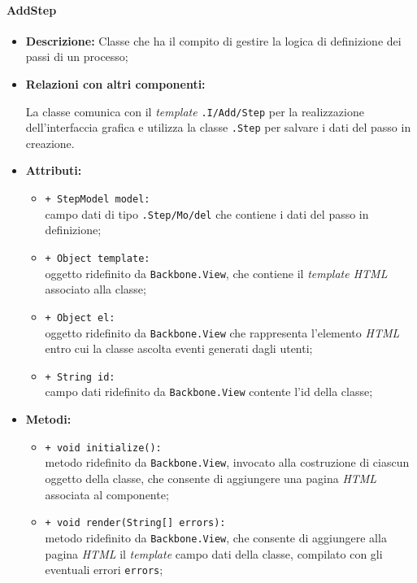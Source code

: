 \paragraph{AddStep}
\label{addStep}
\begin{flushleft}
\begin{itemize}
\item \textbf{Descrizione:} Classe che ha il compito di gestire la logica di definizione dei passi di un processo;
\item \textbf{Relazioni con altri componenti:}
\begin{sloppypar}
La classe comunica con il \textit{template} \texttt{\viewAdmin{}.I\fshyp{}Add\fshyp{}Step} per la realizzazione dell'interfaccia grafica e utilizza la classe \texttt{\model{}.Step} per salvare i dati del passo in creazione.
\end{sloppypar}
\item \textbf{Attributi:}
\begin{sloppypar}
\begin{itemize}
\item \texttt{+ StepModel model:}\\ campo dati di tipo \texttt{\model{}.Step\fshyp{}Mo\fshyp{}del} che contiene i dati del passo in definizione;
\item \texttt{+ Object template:}\\ oggetto ridefinito da \texttt{Backbone.View}, che contiene il \textit{template HTML} associato alla classe;
\item \texttt{+ Object el:}\\ oggetto ridefinito da \texttt{Backbone.View} che rappresenta l'elemento \textit{HTML} entro cui la classe ascolta eventi generati dagli utenti;
\item \texttt{+ String id:}\\ campo dati ridefinito da \texttt{Backbone.View} contente l'id della classe;
\end{itemize}
\end{sloppypar}
\item \textbf{Metodi:}
\begin{sloppypar}
\begin{itemize}
\item \texttt{+ void initialize():}\\ metodo ridefinito da \texttt{Backbone.View}, invocato alla costruzione di ciascun oggetto della classe, che consente di aggiungere una pagina \textit{HTML} associata al componente;
\item \texttt{+ void render(String[] errors):}\\ metodo ridefinito da \texttt{Backbone.View}, che consente di aggiungere alla pagina \textit{HTML} il \textit{template} campo dati della classe, compilato con gli eventuali errori \texttt{errors};

\end{itemize}
\end{sloppypar}
\end{itemize}
\end{flushleft}
